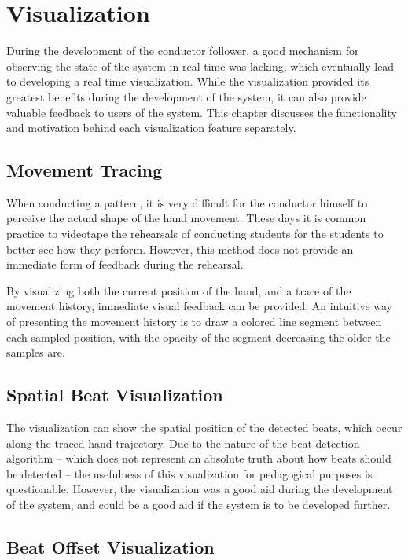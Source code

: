 \chapter{Visualization}
\label{chapter:visualization}

During the development of the conductor follower,
a good mechanism for observing the state of the system
in real time was lacking,
which eventually lead to developing a real time visualization.
While the visualization provided its greatest benefits
during the development of the system,
it can also provide valuable feedback to users of the system.
This chapter discusses the functionality
and motivation behind each visualization feature separately.

\section{Movement Tracing}

When conducting a pattern,
it is very difficult for the conductor himself to
perceive the actual shape of the hand movement.
These days it is common practice to 
videotape the rehearsals of conducting students \cite{?}
for the students to better see how they perform.
However, this method does not provide an
immediate form of feedback during the rehearsal.

By visualizing both the current position of the hand,
and a trace of the movement history,
immediate visual feedback can be provided.
An intuitive way of presenting the movement history
is to draw a colored line segment between each sampled position,
with the opacity of the segment decreasing the older the samples are.

\section{Spatial Beat Visualization}

The visualization can show the spatial position
of the detected beats,
which occur along the traced hand trajectory.
Due to the nature of the beat detection algorithm --
which does not represent an absolute truth about
how beats should be detected --
the usefulness of this visualization for
pedagogical purposes is questionable.
However, the visualization was a good aid
during the development of the system,
and could be a good aid if the system is to be developed further.

\section{Beat Offset Visualization}

